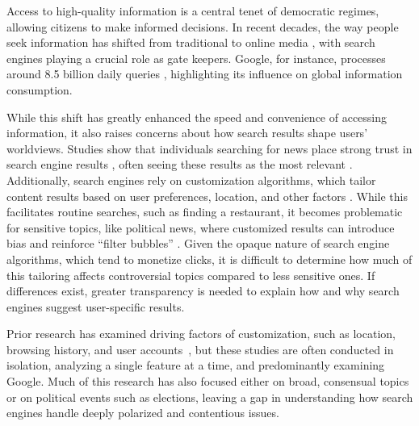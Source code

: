 
Access to high-quality information is a central tenet of democratic regimes, allowing citizens to make informed decisions. In recent decades, the way people seek information has shifted from traditional to online media \cite{pew_news_2006, news_access, ReutersInstitute2024}, with search engines playing a crucial role as gate keepers. Google, for instance, processes around 8.5 billion daily queries \cite{google_queries, google_maximize_access}, highlighting its influence on global information consumption.

While this shift has greatly enhanced the speed and convenience of accessing information, it also raises concerns about how search results shape users' worldviews. Studies show that individuals searching for news place strong trust in search engine results \cite{misplaced_trust, google_trust, trust_survey_2012, trust_survey_2017, trust_survey_2020}, often seeing these results as the most relevant \cite{EuropeanCommission2016}. Additionally, search engines rely on customization algorithms, which tailor content results based on user preferences, location, and other factors \cite{duckduckgo_privacy, google_terms, Yahoo2024, inconsistent_search_results, personalization_web_search}. While this facilitates routine searches, such as finding a restaurant, it becomes problematic for sensitive topics, like political news, where customized results can introduce bias and reinforce ``filter bubbles'' \cite{eli-pariser, personalization_web_search}. Given the opaque nature of search engine algorithms, which tend to monetize clicks, it is difficult to determine how much of this tailoring affects controversial topics compared to less sensitive ones. If differences exist, greater transparency is needed to explain how and why search engines suggest user-specific results.

Prior research has examined driving factors of customization, such as location, browsing history, and user accounts~\cite{inconsistent_search_results, personalization_web_search, political_personalization}, but these studies are often conducted in isolation, analyzing a single feature at a time, and predominantly examining Google. Much of this research has also focused either on broad, consensual topics or on political events such as elections, leaving a gap in understanding how search engines handle deeply polarized and contentious issues.

